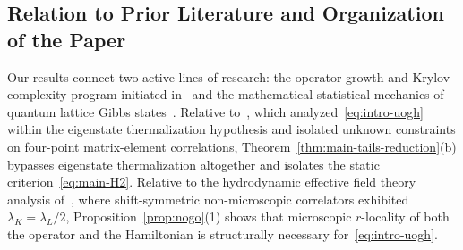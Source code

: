 \documentclass[11pt,a4paper]{article}
\numberwithin{equation}{section}
\theoremstyle{plain}
\theoremstyle{definition}
\begin{document}
\subsection{Relation to Prior Literature and Organization of the Paper}\label{subsec:org}

Our results connect two active lines of research: the operator-growth and Krylov-complexity program initiated in~\cite{Parker2019,Avdoshkin2020,Qi2019,Roberts2018,Murthy2019} and the mathematical statistical mechanics of quantum lattice Gibbs states~\cite{Araki1969,Lieb1972,Kotecky1986,Ueltschi2004,Kliesch2014,Frohlich2015,Abanin2015,Arad2016,Kato2019,Kuwahara2020a,Kuwahara2020b,Anshu2021,Bluhm2025,Alhambra2023,Bakshi2024,Rouze2026,Kim2026}. Relative to~\cite{Murthy2019}, which analyzed~\eqref{eq:intro-uogh} within the eigenstate thermalization hypothesis and isolated unknown constraints on four-point matrix-element correlations, Theorem~\ref{thm:main-tails-reduction}(b) bypasses eigenstate thermalization altogether and isolates the static criterion~\eqref{eq:main-H2}. Relative to the hydrodynamic effective field theory analysis of~\cite{Demulder2026}, where shift-symmetric non-microscopic correlators exhibited $\lambda_K = \lambda_L/2$, Proposition~\ref{prop:nogo}(1) shows that microscopic $r$-locality of both the operator and the Hamiltonian is structurally necessary for~\eqref{eq:intro-uogh}.
\end{document}
